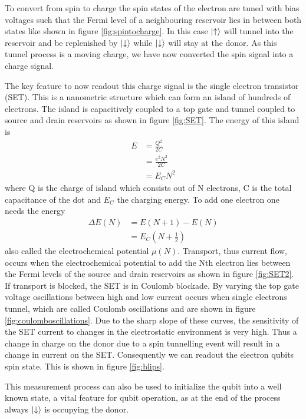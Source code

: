 To convert from spin to charge the spin states of the electron are tuned with bias voltages such that the Fermi level of a neighbouring reservoir lies in between both states like shown in figure \ref{fig:spintocharge}. In this case $\ket{\uparrow}$ will tunnel into the reservoir and be replenished by $\ket{\downarrow}$ while $\ket{\downarrow}$ will stay at the donor. As this tunnel process is a moving charge, we have now converted the spin signal into a charge signal. 

The key feature to now readout this charge signal is the single electron transistor (SET). This is a nanometric structure which can form an island of hundreds of electrons. The island is capacitively coupled to a top gate and tunnel coupled to source and drain reservoirs as shown in figure \ref{fig:SET}. The energy of this island is 
\begin{align*}
E & =  \frac{Q^2}{2C}\\
& =  \frac{e^2N^2}{2C}\\
& =  E_C N^2
\end{align*}
where Q is the charge of island which consists out of N electrons, C is the total capacitance of the dot and $E_C$ the charging energy. 
To add one electron one needs the energy 
\begin{align*}
\Delta E(N)& =  E(N+1)-E(N)\\
 & =  E_C\left(N+\frac{1}{2}\right)
\end{align*}
also called the electrochemical potential $\mu(N)$. Transport, thus current flow, occurs when the electrochemical potential to add the Nth electron lies between the Fermi levels of the source and drain reservoirs as shown in figure \ref{fig:SET2}. If transport is blocked, the SET is in Coulomb blockade. By varying the top gate voltage oscillations between high and low current occurs when single electrons tunnel, which are called Coulomb oscillations and are shown in figure \ref{fig:coulomboscillations}. Due to the sharp slope of these curves, the sensitivity of the SET current to changes in the electrostatic environment is very high. Thus a change in charge on the donor due to a spin tunnelling event will result in a change in current on the SET. Consequently we can readout the electron qubits  spin state. This is shown in figure \ref{fig:blips}. 

This measurement process can also be used to initialize the qubit into a well known state, a vital feature for qubit operation, as at the end of the process always $\ket{\downarrow}$ is occupying the donor. 


